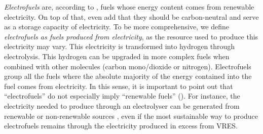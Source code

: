 

\textit{Electrofuels} are, according to \citet{JRC_alternative}, fuels whose energy content comes from renewable electricity. On top of that, \citet{goldmann2018} even add that they should be carbon-neutral and serve as a storage capacity of electricity. To be more comprehensive, we define \textit{electrofuels as fuels produced from electricity}, as the resource used to produce this electricity may vary. This electricity is transformed into hydrogen through electrolysis. This hydrogen can be upgraded in more complex fuels when combined with other molecules (\eg carbon mono/dioxide or nitrogen). Electrofuels group all the fuels where the absolute majority of the energy contained into the fuel comes from electricity. In this sense, it is important to point out that ``electrofuels'' do not especially imply ``renewable fuels'' (). For instance, the electricity needed to produce  through an electrolyser can be generated from renewable or non-renewable sources \cite{bhandari2014}, even if the most sustainable way to produce electrofuels remains through the electricity produced in excess from \gls{VRES}.

